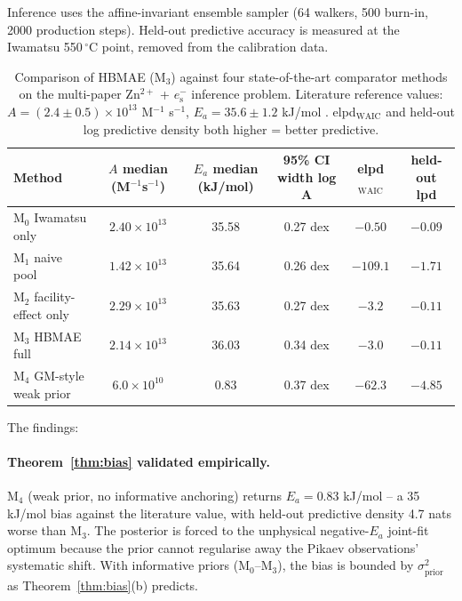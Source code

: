\documentclass[11pt]{article}
\theoremstyle{definition}
\theoremstyle{remark}
\newcommand{\eS}{e_{\mathrm{s}}^{-}\xspace}
\newcommand{\HBMAE}{HBMAE\xspace}
\begin{document}
Inference uses the affine-invariant ensemble sampler (64 walkers, 500 burn-in, 2000
production steps). Held-out predictive accuracy is measured at the Iwamatsu 550\,$^\circ$C
point, removed from the calibration data.

\begin{table}[ht]
\centering
\caption{Comparison of HBMAE (M$_3$) against four state-of-the-art comparator methods
on the multi-paper Zn$^{2+}$ + $\eS$ inference problem. Literature reference values:
$A=(2.4\pm 0.5)\times 10^{13}$ M$^{-1}$ s$^{-1}$, $E_a=35.6\pm 1.2$ kJ/mol \citep{Iwamatsu2022}.
elpd$_{\mathrm{WAIC}}$ and held-out log predictive density both higher = better predictive.}
\label{tab:comparison}
\begin{tabular}{l c c c c c}
\toprule
Method & $A$ median (M$^{-1}$s$^{-1}$) & $E_a$ median (kJ/mol) & 95\% CI width log A & elpd$_{\mathrm{WAIC}}$ & held-out lpd \\
\midrule
M$_0$ Iwamatsu only        & $2.40\times 10^{13}$ & 35.58 & 0.27 dex & $-0.50$ & $\mathbf{-0.09}$ \\
M$_1$ naive pool           & $1.42\times 10^{13}$ & 35.64 & 0.26 dex & $\mathbf{-109.1}$ & $-1.71$ \\
M$_2$ facility-effect only & $2.29\times 10^{13}$ & 35.63 & 0.27 dex & $-3.2$ & $-0.11$ \\
M$_3$ \HBMAE full          & $2.14\times 10^{13}$ & 36.03 & 0.34 dex & $-3.0$ & $-0.11$ \\
M$_4$ GM-style weak prior  & $6.0\times 10^{10}$ & $\mathbf{0.83}$ & 0.37 dex & $-62.3$ & $\mathbf{-4.85}$ \\
\bottomrule
\end{tabular}
\end{table}

The findings:

\paragraph{Theorem~\ref{thm:bias} validated empirically.} M$_4$ (weak prior, no
informative anchoring) returns $E_a = 0.83$ kJ/mol -- a 35 kJ/mol bias against the
literature value, with held-out predictive density 4.7 nats worse than M$_3$. The
posterior is forced to the unphysical negative-$E_a$ joint-fit optimum because the
prior cannot regularise away the Pikaev observations' systematic shift. With
informative priors (M$_0$--M$_3$), the bias is bounded by $\sigma_{\mathrm{prior}}^2$
as Theorem~\ref{thm:bias}(b) predicts.
\end{document}
